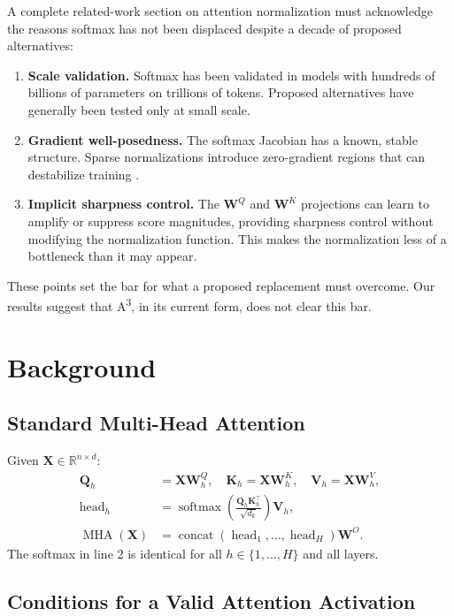 \documentclass[11pt]{article}
\newcommand{\softmax}{\operatorname{softmax}}
\newcommand{\AAA}{\textsc{A\textsuperscript{3}}}
\newcommand{\RR}{\mathbb{R}}
\newcommand{\bQ}{\mathbf{Q}}
\newcommand{\bK}{\mathbf{K}}
\newcommand{\bV}{\mathbf{V}}
\newcommand{\bW}{\mathbf{W}}
\newcommand{\bX}{\mathbf{X}}
\begin{document}
A complete related-work section on attention normalization must acknowledge the reasons softmax has not been displaced despite a decade of proposed alternatives:
\begin{enumerate}[leftmargin=1.5em]
  \item \textbf{Scale validation.} Softmax has been validated in models with hundreds of billions of parameters on trillions of tokens. Proposed alternatives have generally been tested only at small scale.
  \item \textbf{Gradient well-posedness.} The softmax Jacobian has a known, stable structure. Sparse normalizations introduce zero-gradient regions that can destabilize training \citep{martins2016softmax}.
  \item \textbf{Implicit sharpness control.} The $\bW^Q$ and $\bW^K$ projections can learn to amplify or suppress score magnitudes, providing sharpness control without modifying the normalization function. This makes the normalization less of a bottleneck than it may appear.
\end{enumerate}
These points set the bar for what a proposed replacement must overcome. Our results suggest that \AAA{}, in its current form, does not clear this bar.

\section{Background}
\label{sec:background}

\subsection{Standard Multi-Head Attention}

Given $\bX \in \RR^{n \times d}$:
\begin{align}
  \bQ_h &= \bX \bW^Q_h,\quad \bK_h = \bX \bW^K_h,\quad \bV_h = \bX \bW^V_h,\\
  \operatorname{head}_h &= \softmax\!\!\left(\frac{\bQ_h\bK_h^\top}{\sqrt{d_k}}\right)\bV_h,\\
  \operatorname{MHA}(\bX) &= \operatorname{concat}(\operatorname{head}_1,\ldots,\operatorname{head}_H)\bW^O.
\end{align}
The softmax in line 2 is identical for all $h \in \{1,\ldots,H\}$ and all layers.

\subsection{Conditions for a Valid Attention Activation}
\end{document}
